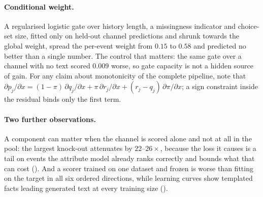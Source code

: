 \paragraph{Conditional weight.} A regularised logistic gate over history length, a missingness
indicator and choice-set size, fitted only on held-out channel predictions and shrunk towards
the global weight, spread the per-event weight from $0.15$ to $0.58$ and predicted no better
than a single number. The control that matters: the same gate over a channel with no text
scored $0.009$ worse, so gate capacity is not a hidden source of gain. For any claim about
monotonicity of the complete pipeline, note that
$\partial p_j/\partial x = (1-\pi)\,\partial q_j/\partial x + \pi\,\partial r_j/\partial x +
(r_j - q_j)\,\partial \pi/\partial x$; a sign constraint inside the residual binds only the
first term.

\paragraph{Two further observations.} A component can matter when the channel is scored alone
and not at all in the pool: the largest knock-out attenuates by $22$--$26\times$, because the
loss it causes is a tail on events the attribute model already ranks correctly and
 bounds what that can cost (). And a scorer trained on one
dataset and frozen is worse than fitting on the target in all six ordered directions, while
learning curves show templated facts leading generated text at every training size
().
